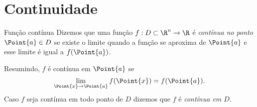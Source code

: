 \begin{comment}
\subsection{Limite de funções de várias variáveis usando sequências}

Deixamos como exercício provar que 
$$\lim\limits_{\Point{x}\rightarrow \Point{a}} f(\Point{x})=L$$
equivale a dizer que para qualquer sequência \( \{\Point{x}_k\} \) de vetores diferentes de \( \Point{a} \) que converge para \( \Point{a} \), a sequência de números reais correspondente \( \{f(\Point{x}_k)\} \) converge para \( L \). Em outras palavras: 


\begin{theorem}{}{}
Dada uma função $f:D\subset\R^n\to\R$, temos que 
$$\lim\limits_{\Point{x}\rightarrow \Point{a}} f(\Point{x})=L$$
se, e somente se, para cada sequência \( \{\Point{x}_k\} \) tal que \( \lim\limits_{{k \to \infty}} \Point{x}_k = \Point{a} \), deve-se ter \( \lim\limits_{{k \to \infty}} f(\Point{x}_k) = L \).
\end{theorem}

Essa definição é uma extensão natural da definição de limite para funções de uma variável, mas agora aplicada a funções de várias variáveis e considerando a convergência de sequências de vetores.


\begin{example}{}{}
    Mostre, usando sequências, que não existe 
    $$\lim\limits_{\Point{x}\rightarrow\Point{a}} \dfrac{xy^2}{x^2+y^4}.$$
\end{example}
\end{comment}



\section{Continuidade}


\begin{definition}{Função contínua}{}
Dizemos que uma função \( f:D\subset\R^n\to\R \) é \textit{contínua no ponto}  \( \Point{a}\in D \) se existe o limite quando a função se aproxima de $\Point{a}$ e esse limite é igual a $f(\Point{a})$.
\end{definition}

Resumindo, $f$ é contínua em $\Point{a}$ se 
$$\lim_{\Point{x}\rightarrow\Point{a}}f(\Point{x})=f(\Point{a}).$$
Caso $f$ seja contínua em todo ponto de $D$ dizemos que $f$ é \textit{contínua em $D$}. 



